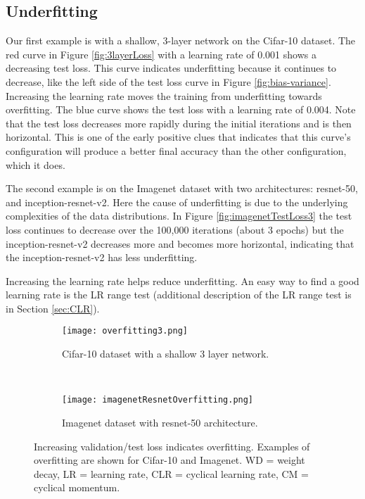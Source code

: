 \documentclass{article} %
\begin{document}
\subsection{Underfitting}
\label{sec:underfitting}

Our first example is with a shallow, 3-layer network on the Cifar-10 dataset.  The red curve in Figure \ref{fig:3layerLoss} with a learning rate of 0.001 shows a decreasing test loss.  This  curve indicates underfitting because it continues to decrease, like the left side of the test loss curve in Figure \ref{fig:bias-variance}. Increasing the learning rate moves the training from underfitting towards overfitting.  The blue curve shows the test loss with a learning rate of 0.004.  Note that the test loss decreases more rapidly during the initial iterations and is then horizontal.  This is one of the early positive clues that indicates that this curve's configuration will produce a better final accuracy than the other configuration, which it does.  

The second example is on the Imagenet dataset with two architectures: resnet-50, and inception-resnet-v2.  Here the cause of underfitting is due to the underlying complexities of the data distributions.  In Figure \ref{fig:imagenetTestLoss3} the test loss continues to decrease over the 100,000 iterations (about 3 epochs) but the inception-resnet-v2 decreases more and becomes more horizontal, indicating that the inception-resnet-v2 has less underfitting.

Increasing the learning rate helps reduce underfitting.  An easy way to find a good learning rate is the LR range test \citep{smith2017cyclical} (additional description of the LR range test is in Section \ref{sec:CLR}).  

\begin{figure}[tbh]
	\centering
	\begin{subfigure}[b]{0.47\textwidth}
		\texttt{[image: overfitting3.png]}  %
		\caption{Cifar-10 dataset with a shallow 3 layer network.}
		\label{fig:overfitting3}       %
	\end{subfigure}
	\quad
	\hfill
	~ %
	\centering
	\begin{subfigure}[b]{0.47\textwidth}
		\texttt{[image: imagenetResnetOverfitting.png]}
		\caption{Imagenet dataset with resnet-50 architecture.}
		\label{fig:imagenetResnetOverfitting}       %
	\end{subfigure}
	\caption{Increasing validation/test loss indicates overfitting.  Examples of overfitting are shown for Cifar-10 and Imagenet. WD = weight decay, LR = learning rate, CLR = cyclical learning rate, CM = cyclical momentum.}
	\label{fig:OverfittingEx}
	\vspace{-15pt}	
\end{figure}
\end{document}

